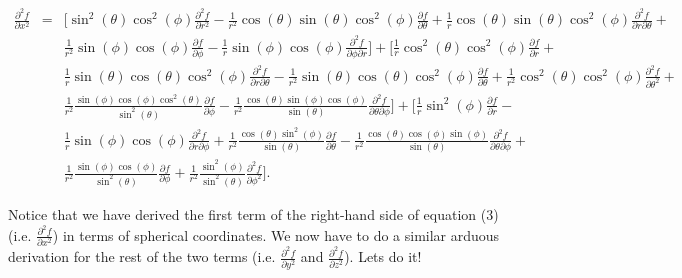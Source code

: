 \documentclass[12pt]{article}
\begin{document}
\begin{eqnarray*}
\frac{{\partial}^2 f}{\partial x^2} &=& \Big[{\sin}^2(\theta){\cos}^2(\phi)\frac{{\partial}^2 f}{\partial r^2} - \frac{1}{r^2}\cos(\theta)\sin(\theta){\cos}^2(\phi)\frac{\partial f}{\partial\theta} + \frac{1}{r}\cos(\theta)\sin(\theta){\cos}^2(\phi)\frac{{\partial}^2 f}{\partial r \partial\theta} + \\
& & \frac{1}{r^2}\sin(\phi)\cos(\phi)\frac{\partial f}{\partial\phi} - \frac{1}{r}\sin(\phi)\cos(\phi)\frac{{\partial}^2 f}{\partial\phi\partial r}\Big] + \Big[\frac{1}{r}{\cos}^2(\theta){\cos}^2(\phi)\frac{\partial f}{\partial r}
+ \\
& & \frac{1}{r}\sin(\theta)\cos(\theta){\cos}^2(\phi)\frac{{\partial}^2 f}{\partial r\partial\theta} - \frac{1}{r^2}\sin(\theta)\cos(\theta){\cos}^2(\phi)\frac{\partial f}{\partial\theta} + \frac{1}{r^2}{\cos}^2(\theta){\cos}^2(\phi)\frac{{\partial}^2 f}{\partial{\theta}^2} + \\
& & \frac{1}{r^2}\frac{\sin(\phi)\cos(\phi){\cos}^2(\theta)}{{\sin}^2(\theta)}\frac{\partial f}{\partial\phi} - \frac{1}{r^2}\frac{\cos(\theta)\sin(\phi)\cos(\phi)}{\sin(\theta)}\frac{{\partial}^2 f}{\partial\theta\partial\phi}\Big] + \Big[\frac{1}{r}{\sin}^2(\phi)\frac{\partial f}{\partial r} - \\ 
& & \frac{1}{r}\sin(\phi)\cos(\phi)\frac{{\partial}^2 f}{\partial r\partial\phi} + \frac{1}{r^2}\frac{\cos(\theta){\sin}^2(\phi)}{\sin(\theta)}\frac{\partial f}{\partial\theta} - \frac{1}{r^2}\frac{\cos(\theta)\cos(\phi)\sin(\phi)}{\sin(\theta)}\frac{{\partial}^2 f}{\partial\theta \partial\phi} + \\
& & \frac{1}{r^2}\frac{\sin(\phi)\cos(\phi)}{{\sin}^2(\theta)}\frac{\partial f}{\partial\phi} + \frac{1}{r^2}\frac{{\sin}^2(\phi)}{{\sin}^2(\theta)}\frac{{\partial}^2 f}{\partial{\phi}^2}\Big].
\end{eqnarray*}

Notice that we have derived the first term of the right-hand side of equation (3) (i.e. $\frac{{\partial}^2 f}{\partial x^2}$) in terms of spherical coordinates. We now have to do a similar arduous derivation for the rest of the two terms (i.e. $\frac{{\partial}^2 f}{\partial y^2}$ and $\frac{{\partial}^2 f}{\partial z^2}$). Lets do it!
\end{document}
